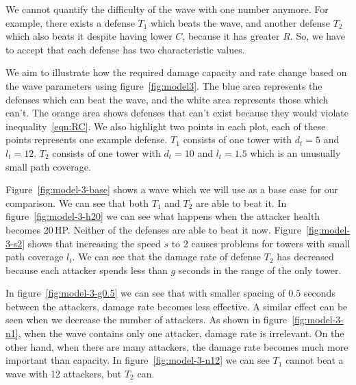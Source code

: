 We cannot quantify the difficulty of the wave with one number anymore.
For example, there exists a defense $T_1$ which beats the wave, and another defense $T_2$ which also beats it despite having lower $C$, because it has greater $R$.
So, we have to accept that each defense has two characteristic values.

We aim to illustrate how the required damage capacity and rate change based on the wave parameters using figure~\ref{fig:model3}.
The blue area represents the defenses which can beat the wave, and the white area represents those which can't.
The orange area shows defenses that can't exist because they would violate inequality~\ref{eqn:RC}.
We also highlight two points in each plot, each of these points represents one example defense.
$T_1$ consists of one tower with $d_t=5$ and $l_t=12$.
$T_2$ consists of one tower with $d_t=10$ and $l_t=1.5$ which is an unusually small path coverage.

Figure~\ref{fig:model-3-base} shows a wave which we will use as a base case for our comparison.
We can see that both $T_1$ and $T_2$ are able to beat it.
In figure~\ref{fig:model-3-h20} we can see what happens when the attacker health becomes 20\,HP.
Neither of the defenses are able to beat it now.
Figure~\ref{fig:model-3-s2} shows that increasing the speed $s$ to 2 causes problems for towers with small path coverage $l_t$.
We can see that the damage rate of defense $T_2$ has decreased because each attacker spends less than $g$ seconds in the range of the only tower.

In figure~\ref{fig:model-3-g0.5} we can see that with smaller spacing of $0.5$ seconds between the attackers, damage rate becomes less effective.
A similar effect can be seen when we decrease the number of attackers.
As shown in figure~\ref{fig:model-3-n1}, when the wave contains only one attacker, damage rate is irrelevant.
On the other hand, when there are many attackers, the damage rate becomes much more important than capacity.
In figure~\ref{fig:model-3-n12} we can see $T_1$ cannot beat a wave with 12 attackers, but $T_2$ can.

